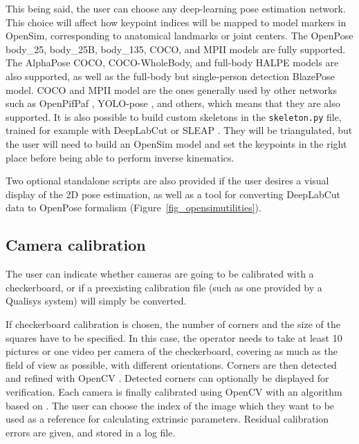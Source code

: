 This being said, the user can choose any deep-learning pose estimation network. This choice will affect how keypoint indices will be mapped to model markers in OpenSim, corresponding to anatomical landmarks or joint centers. The OpenPose body\_25, body\_25B, body\_135, COCO, and MPII models are fully supported. The AlphaPose COCO, COCO-WholeBody, and full-body HALPE models are also supported, as well as the full-body but single-person detection BlazePose model. COCO and MPII model are the ones generally used by other networks such as OpenPifPaf \cite{Kreiss2021}, YOLO-pose \cite{Maji2022, Wang2022b}, and others, which means that they are also supported. It is also possible to build custom skeletons in the \texttt{skeleton.py} file, trained for example with DeepLabCut \cite{Mathis2018, Lauer2022} or SLEAP \cite{Pereira2022}. They will be triangulated, but the user will need to build an OpenSim model and set the keypoints in the right place before being able to perform inverse kinematics.


Two optional standalone scripts are also provided if the user desires a visual display of the 2D pose estimation, as well as a tool for converting DeepLabCut data to OpenPose formalism (Figure~\ref{fig_opensimutilities}).


\subsection{Camera calibration}

The user can indicate whether cameras are going to be calibrated with a checkerboard, or if a preexisting calibration file (such as one provided by a Qualisys system) will simply be converted.

If checkerboard calibration is chosen, the number of corners and the size of the squares have to be specified. In this case, the operator needs to take at least 10 pictures or one video per camera of the checkerboard, covering as much as the field of view as possible, with different orientations. Corners are then detected and refined with OpenCV \cite{Bradski2000}. Detected corners can optionally be displayed for verification. Each camera is finally calibrated using OpenCV with an algorithm based on \cite{Zhang2000}. The user can choose the index of the image which they want to be used as a reference for calculating extrinsic parameters. Residual calibration errors are given, and stored in a log file.


